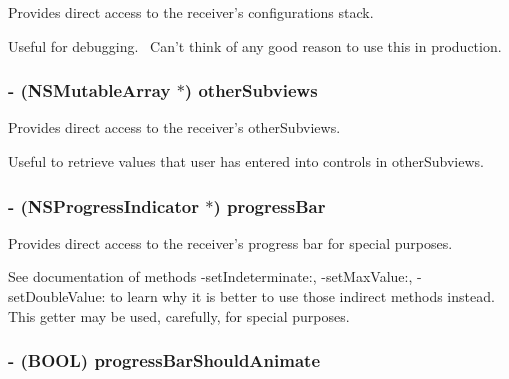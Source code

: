 Provides direct access to the receiver's configurations stack. 

Useful for debugging.~ Can't think of any good reason to use this in production. \hypertarget{interface_s_s_y_alert_eb559c5354ac41e9143ac2970de5addc}{
\subsubsection[{otherSubviews}]{\setlength{\rightskip}{0pt plus 5cm}- (NSMutableArray $\ast$) otherSubviews}}
\label{interface_s_s_y_alert_eb559c5354ac41e9143ac2970de5addc}


Provides direct access to the receiver's otherSubviews. 

Useful to retrieve values that user has entered into controls in otherSubviews. \hypertarget{interface_s_s_y_alert_cc8eac2be6bd9cc10999af6b51994082}{
\subsubsection[{progressBar}]{\setlength{\rightskip}{0pt plus 5cm}- (NSProgressIndicator $\ast$) progressBar}}
\label{interface_s_s_y_alert_cc8eac2be6bd9cc10999af6b51994082}


Provides direct access to the receiver's progress bar for special purposes. 

See documentation of methods -setIndeterminate:, -setMaxValue:, -setDoubleValue: to learn why it is better to use those indirect methods instead. This getter may be used, carefully, for special purposes. \hypertarget{interface_s_s_y_alert_57507576c298844a045e2e9a9fb2ce0c}{
\subsubsection[{progressBarShouldAnimate}]{\setlength{\rightskip}{0pt plus 5cm}- (BOOL) progressBarShouldAnimate}}
\label{interface_s_s_y_alert_57507576c298844a045e2e9a9fb2ce0c}


